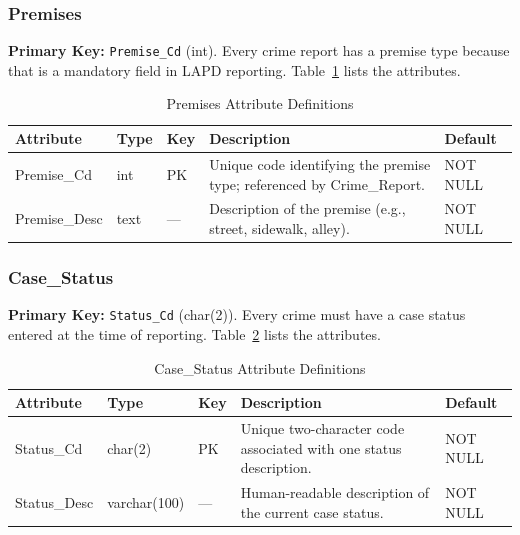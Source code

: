 \documentclass[conference]{IEEEtran}
\begin{document}
\subsubsection{Premises}

\textbf{Primary Key:} \texttt{Premise\_Cd} (int). Every crime report has a premise type because that is a mandatory field in LAPD reporting. Table~\ref{tab:premises} lists the attributes.

\begin{table}[htbp]
\caption{Premises Attribute Definitions}
\label{tab:premises}
\begin{center}
\footnotesize
\begin{tabular}{|p{1.6cm}|p{1.3cm}|p{0.5cm}|p{3.2cm}|p{1.2cm}|}
\hline
\textbf{Attribute} & \textbf{Type} & \textbf{Key} & \textbf{Description} & \textbf{Default} \\
\hline
Premise\_Cd & int & PK & Unique code identifying the premise type; referenced by Crime\_Report. & NOT NULL \\
\hline
Premise\_Desc & text & --- & Description of the premise (e.g., street, sidewalk, alley). & NOT NULL \\
\hline
\end{tabular}
\end{center}
\end{table}

\subsubsection{Case\_Status}

\textbf{Primary Key:} \texttt{Status\_Cd} (char(2)). Every crime must have a case status entered at the time of reporting. Table~\ref{tab:casestatus} lists the attributes.

\begin{table}[htbp]
\caption{Case\_Status Attribute Definitions}
\label{tab:casestatus}
\begin{center}
\footnotesize
\begin{tabular}{|p{1.6cm}|p{1.3cm}|p{0.5cm}|p{3.2cm}|p{1.2cm}|}
\hline
\textbf{Attribute} & \textbf{Type} & \textbf{Key} & \textbf{Description} & \textbf{Default} \\
\hline
Status\_Cd & char(2) & PK & Unique two-character code associated with one status description. & NOT NULL \\
\hline
Status\_Desc & varchar(100) & --- & Human-readable description of the current case status. & NOT NULL \\
\hline
\end{tabular}
\end{center}
\end{table}
\end{document}

